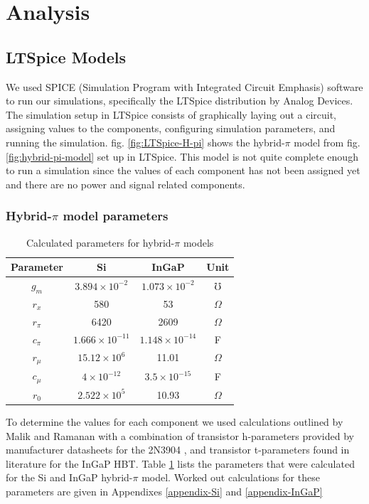 \documentclass[conference]{IEEEtran}
\begin{document}
\section{Analysis}

\subsection{LTSpice Models}

We used SPICE (Simulation Program with Integrated Circuit Emphasis) software to run our simulations, specifically the LTSpice
distribution by Analog Devices. The simulation setup in LTSpice consists of graphically laying out a circuit, assigning values
to the components, configuring simulation parameters, and running the simulation. fig. \ref{fig:LTSpice-H-pi} shows the
hybrid-$\pi$ model from fig. \ref{fig:hybrid-pi-model} set up in LTSpice. This model is not quite complete enough to run a 
simulation since the values of each component has not been assigned yet and there are no power and signal related components.

\subsubsection{Hybrid-$\pi$ model parameters}

\begin{table}[htbp]
    \centering
    \caption{Calculated parameters for hybrid-$\pi$ models}
    \begin{tabular}{|c|c|c|c|}
        \hline
        Parameter & Si & InGaP & Unit\\
        \hline
        $g_m$ & $3.894 \times 10^{-2}$ & $1.073 \times 10^{-2}$ & $\mho$ \\
        $r_x$ & 580 & 53 & $\Omega$ \\
        $r_\pi$ & 6420 & 2609 & $\Omega$ \\
        $c_\pi$ & $1.666 \times 10^{-11}$ & $1.148 \times 10^{-14}$ & F \\
        $r_\mu$ & $15.12 \times 10^{6}$ & 11.01 & $\Omega$ \\
        $c_\mu$ & $4 \times 10^{-12}$ & $3.5 \times 10^{-15}$ & F \\
        $r_0$ & $2.522 \times 10^{5}$ & 10.93 & $\Omega$ \\
        \hline
    \end{tabular}
    \label{tab:h-pi_params}
\end{table}

To determine the values for each component we used calculations outlined by Malik \cite{Malik1990} and Ramanan
\cite{ramanan_functional_1985} with a combination of transistor h-parameters provided by manufacturer datasheets
for the 2N3904 \cite{3904}, and transistor t-parameters found in literature for the InGaP HBT\cite{Oka2001}.
Table \ref{tab:h-pi_params} lists the parameters that were calculated for the Si and InGaP hybrid-$\pi$ model. Worked out
calculations for these parameters are given in Appendixes \ref{appendix-Si} and \ref{appendix-InGaP}
\end{document}
